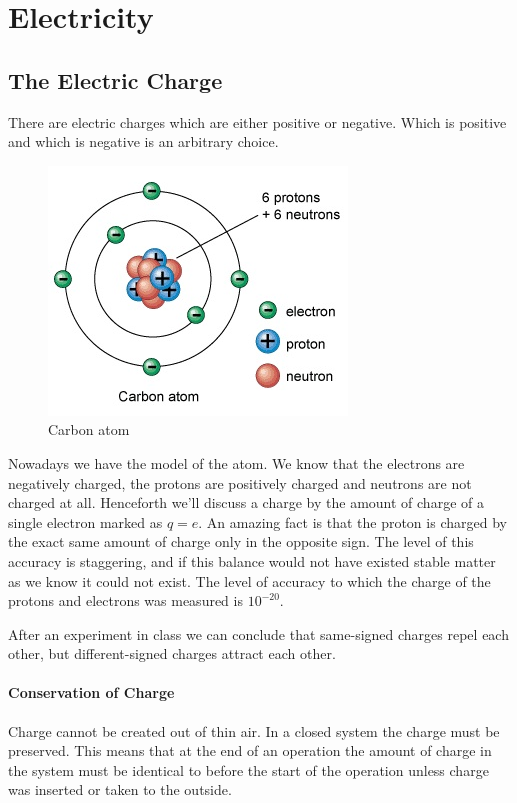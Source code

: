 \documentclass[a4paper]{book}
\begin{document}
	\part{Electricity}
	\chapter{The Electric Charge}
	There are electric charges which are either positive or negative. Which is positive and which is negative is an arbitrary choice.
	
	\begin{figure}
	\begin{center}
		\includegraphics[scale=0.5]{carb-atom}
	\end{center}
	\caption{Carbon atom}
	\end{figure}
	
	Nowadays we have the model of the atom. We know that the electrons are negatively charged, the protons are positively charged and neutrons are not charged at all. Henceforth we'll discuss a charge by the amount of charge of a single electron marked as $q=e$. An amazing fact is that the proton is charged by the exact same amount of charge only in the opposite sign. The level of this accuracy is staggering, and if this balance would not have existed stable matter as we know it could not exist. The level of accuracy to which the charge of the protons and electrons was measured is $10^{-20}$.
	
	After an experiment in class we can conclude that same-signed charges repel each other, but different-signed charges attract each other.
	
	\subsection*{Conservation of Charge}
	
	Charge cannot be created out of thin air. In a closed system the charge must be preserved. This means that at the end of an operation the amount of charge in the system must be identical to before the start of the operation unless charge was inserted or taken to the outside.
	
\end{document}
